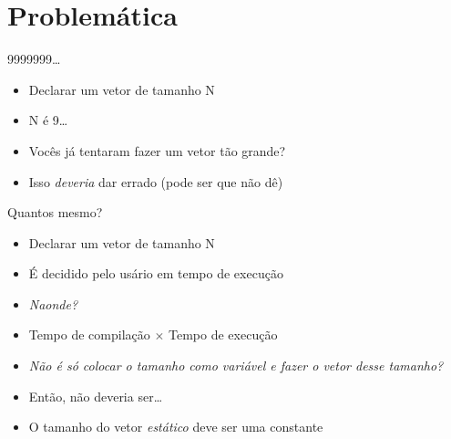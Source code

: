 \documentclass[14pt]{beamer}
\subtitle{O monstro do armário}
\begin{document}
	
	\begin{frame}
		\titlepage
	\end{frame}

	\begin{frame}
		\tableofcontents
	\end{frame}

	\section{Problemática}
		\begin{frame}{9999999\dots}
			\begin{itemize}
				\presentationPause\item Declarar um vetor de tamanho N
				\presentationPause\item N é 9\presentationPause9\dots
				\presentationPause\item Vocês já tentaram fazer um vetor tão grande?
			\end{itemize}
			\presentationPause
			\begin{itemize}
				\presentationPause\item Isso \textit{deveria} dar errado \presentationPause(pode ser que não dê)
			\end{itemize}
		\end{frame}

		\begin{frame}{Quantos mesmo?}
			\begin{itemize}
				\presentationPause\item Declarar um vetor de tamanho N
				\presentationPause\item É decidido pelo usário em tempo de execução
				\presentationPause\item \textit{Naonde?}
				\presentationPause\item Tempo de compilação $\times$ Tempo de execução
				\presentationPause\item \textit{Não é só colocar o tamanho como variável e fazer o vetor desse tamanho?}
			\end{itemize}
			\presentationPause
			\begin{itemize}
				\presentationPause\item Então\presentationPause, não deveria ser\dots
				\presentationPause\item O tamanho do vetor \emph{estático} deve ser uma constante
			\end{itemize}
		\end{frame}
\end{document}
